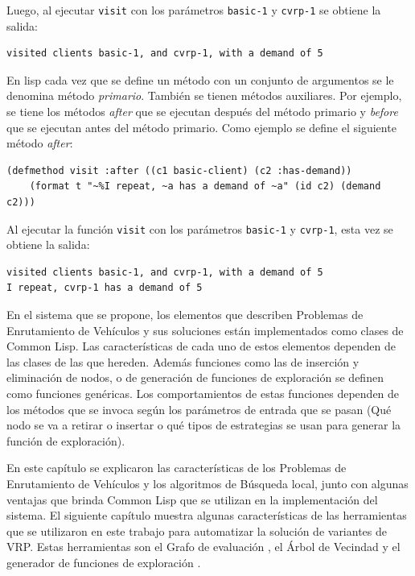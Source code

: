 Luego, al ejecutar \texttt{visit} con los parámetros \texttt{basic-1} y \texttt{cvrp-1} se obtiene la salida:

\begin{lstlisting}
visited clients basic-1, and cvrp-1, with a demand of 5
\end{lstlisting}

En lisp cada vez que se define un método con un conjunto de argumentos se le denomina método \textit{primario}. También se tienen métodos auxiliares. Por ejemplo, se tiene los métodos \textit{after} que se ejecutan después del método primario y \textit{before} que se ejecutan antes del método primario. Como ejemplo se define el siguiente método \textit{after}:

\begin{lstlisting}
(defmethod visit :after ((c1 basic-client) (c2 :has-demand))
	(format t "~%I repeat, ~a has a demand of ~a" (id c2) (demand c2)))
\end{lstlisting}

Al ejecutar la función \texttt{visit} con los parámetros \texttt{basic-1} y \texttt{cvrp-1}, esta vez se obtiene la salida:

\begin{lstlisting}
visited clients basic-1, and cvrp-1, with a demand of 5
I repeat, cvrp-1 has a demand of 5
\end{lstlisting}

En el sistema que se propone, los elementos que describen Problemas de Enrutamiento de Vehículos y sus soluciones están implementados como clases de Common Lisp. Las características de cada uno de estos elementos dependen de las clases de las que hereden. Además funciones como las de inserción y eliminación de nodos, o de generación de funciones de exploración se definen como funciones genéricas. Los comportamientos de estas funciones dependen de los métodos que se invoca según los parámetros de entrada que se pasan (Qué nodo se va a retirar o insertar o qué tipos de estrategias se usan para generar la función de exploración).

En este capítulo se explicaron las características de los Problemas de Enrutamiento de Vehículos y los algoritmos de Búsqueda local, junto con algunas ventajas que brinda Common Lisp que se utilizan en la implementación del sistema. El siguiente capítulo muestra algunas características de las herramientas que se utilizaron en este trabajo para automatizar la solución de variantes de VRP. Estas herramientas son el Grafo de evaluación \cite{JJ}, el Árbol de Vecindad \cite{Hector} y el generador de funciones de exploración \cite{Heidy}.


